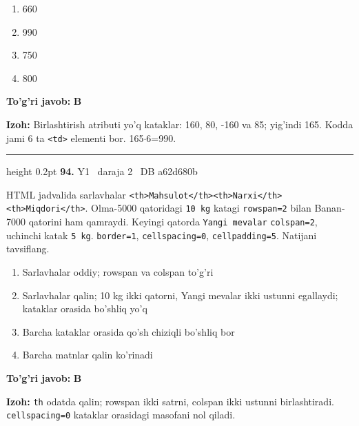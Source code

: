 \documentclass[10pt,a4paper,oneside]{article}
\begin{document}
\begin{enumerate}[label=\Alph*),leftmargin=9mm]
\item 660
\item 990
\item 750
\item 800
\end{enumerate}
\begin{tcolorbox}[enhanced,breakable,colback=teal!4,colframe=teal!45!black,boxrule=0.45pt,arc=1.2mm,left=2.8mm,right=2.8mm,top=2mm,bottom=2mm,before skip=2mm,after skip=2mm]
\textbf{\color{teal}To'g'ri javob:} \textbf{B}
\par\smallskip
\textbf{Izoh:} Birlashtirish atributi yo'q kataklar: 160, 80, -160 va 85; yig'indi 165. Kodda jami 6 ta \texttt{\textless{}td\textgreater{}} elementi bor. 165\(\cdot\)6=990.
\end{tcolorbox}
\vspace{2mm}\hrule height 0.2pt \vspace{4mm}
\hypertarget{q94}{\textbf{\color{ink}94.}}  {\color{muted}\scriptsize Y1 \textbullet\ daraja 2 \textbullet\ DB a62d680b}
\par
HTML jadvalida sarlavhalar \texttt{\textless{}th\textgreater{}Mahsulot\textless{}/th\textgreater{}\textless{}th\textgreater{}Narxi\textless{}/th\textgreater{}\textless{}th\textgreater{}Miqdori\textless{}/th\textgreater{}}. Olma-5000 qatoridagi \texttt{10 kg} katagi \texttt{rowspan=2} bilan Banan-7000 qatorini ham qamraydi. Keyingi qatorda \texttt{Yangi mevalar} \texttt{colspan=2}, uchinchi katak \texttt{5 kg}. \texttt{border=1}, \texttt{cellspacing=0}, \texttt{cellpadding=5}. Natijani tavsiflang.
\begin{enumerate}[label=\Alph*),leftmargin=9mm]
\item Sarlavhalar oddiy; rowspan va colspan to'g'ri
\item Sarlavhalar qalin; 10 kg ikki qatorni, Yangi mevalar ikki ustunni egallaydi; kataklar orasida bo'shliq yo'q
\item Barcha kataklar orasida qo'sh chiziqli bo'shliq bor
\item Barcha matnlar qalin ko'rinadi
\end{enumerate}
\begin{tcolorbox}[enhanced,breakable,colback=teal!4,colframe=teal!45!black,boxrule=0.45pt,arc=1.2mm,left=2.8mm,right=2.8mm,top=2mm,bottom=2mm,before skip=2mm,after skip=2mm]
\textbf{\color{teal}To'g'ri javob:} \textbf{B}
\par\smallskip
\textbf{Izoh:} \texttt{th} odatda qalin; rowspan ikki satrni, colspan ikki ustunni birlashtiradi. \texttt{cellspacing=0} kataklar orasidagi masofani nol qiladi.
\end{tcolorbox}
\end{document}

